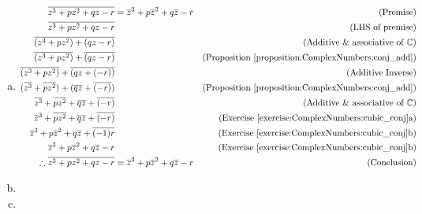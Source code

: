 \begin{enumerate}[(a)]
\item 
	\begin{align*}
	\overline{z^{3} + pz^{2} + qz - r} &= \overline{z}^{3} + p\overline{z}^{2} + q\overline{z} - r    &\text{(Premise)}\\
	\overline{z^{3} + pz^{2} + qz - r} & &\text{(LHS of premise)}\\
	\overline{(z^{3} + pz^{2}) + (qz - r)} & &\text{(Additive \& associative of}\ {\mathbb{C}})\\
	\overline{(z^{3} + pz^{2})} + \overline{(qz - r)} & &\text{(Proposition \ref{proposition:ComplexNumbers:conj_add})}\\
	\overline{(z^{3} + pz^{2})} + \overline{(qz + (-r))} & &\text{(Additive Inverse)}\\
	(\overline{z^{3}} + \overline{pz^{2}}) + (\overline{qz} + \overline{(-r)})& &\text{(Proposition \ref{proposition:ComplexNumbers:conj_add})}\\
	\overline{z^{3}} + \overline{pz^{2}} + \overline{qz} + \overline{(-r)}& &\text{(Additive \& associative of}\ {\mathbb{C}})\\
	\overline{z}^{3}+ \overline{pz^{2}} + \overline{qz} + \overline{(-r)}& &\text{(Exercise \ref{exercise:ComplexNumbers:cubic_conj}a)}\\
	\overline{z}^{3}+ p\overline{z}^{2} + q\overline{z} + \overline{(-1)r}& &\text{(Exercise \ref{exercise:ComplexNumbers:cubic_conj}b)}\\
	\overline{z}^{3}+ p\overline{z}^{2} + q\overline{z} - r& &\text{(Exercise \ref{exercise:ComplexNumbers:cubic_conj}b)}\\
	\therefore \overline{z^{3} + pz^{2} + qz - r} &= \overline{z}^{3} + p\overline{z}^{2} + q\overline{z} - r &\text{(Conclusion)}\\
	\end{align*}	
	
\item
\item
\end{enumerate}


